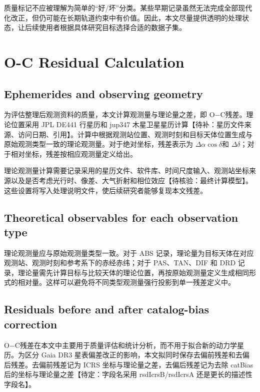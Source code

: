 \documentclass{aastex701}
\newcommand{\oc}{O$-$C}
\newcommand{\dra}{$\Delta\alpha\cos\delta$}
\newcommand{\ddec}{$\Delta\delta$}
\begin{document}
质量标记不应被理解为简单的“好/坏”分类。某些早期记录虽然无法完成全部现代化改正，但仍可能在长期轨道约束中有价值。因此，本文尽量提供透明的处理状态，让后续使用者根据具体研究目标选择合适的数据子集。

\section{O-C Residual Calculation} \label{sec:oc}

\subsection{Ephemerides and observing geometry} \label{subsec:ephemerides}

为评估整理后观测资料的质量，本文计算观测量与理论量之差，即 \oc 残差。理论位置采用 JPL DE441 行星历和 jup347 木星卫星星历计算【待补：星历文件来源、访问日期、引用】。计算中根据观测站位置、观测时刻和目标天体位置生成与原始观测类型一致的理论观测量。对于绝对坐标，残差表示为 \dra 和 \ddec；对于相对坐标，残差按相应观测量定义给出。

理论观测量计算需要记录采用的星历文件、软件库、时间尺度输入、观测站坐标来源以及是否考虑光行时、像差、大气折射和相位效应【待核验：最终计算模型】。这些设置将写入处理说明文件，使后续研究者能够复现本文残差。

\subsection{Theoretical observables for each observation type} \label{subsec:theoretical_obs}

理论观测量应与原始观测量类型一致。对于 ABS 记录，理论量为目标天体在对应观测站、观测时刻和参考系下的赤经赤纬；对于 PAS、TAN、DIF 和 DRD 记录，理论量需先计算目标与比较天体的理论位置，再按原始观测量定义生成相同形式的相对量。这样可以避免将不同类型观测量强行投影到单一残差定义中。

\subsection{Residuals before and after catalog-bias correction} \label{subsec:residual_before_after}

\oc 残差在本文中主要用于质量评估和统计分析，而不用于拟合新的动力学星历。为区分 Gaia DR3 星表偏差改正的影响，本文拟同时保存去偏前残差和去偏后残差。去偏前残差记为 ICRS 坐标与理论量之差，去偏后残差记为去除 catBias 后的坐标与理论量之差【待定：字段名采用 rsdIcrsB/rsdIcrsA 还是更长的描述性字段名】。
\end{document}
